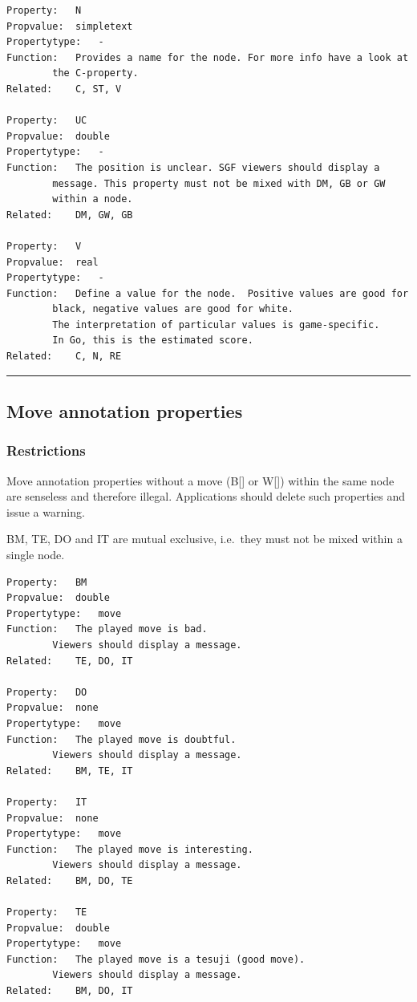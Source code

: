 \begin{verbatim}
Property:   N
Propvalue:  simpletext
Propertytype:   -
Function:   Provides a name for the node. For more info have a look at
        the C-property.
Related:    C, ST, V

Property:   UC
Propvalue:  double
Propertytype:   -
Function:   The position is unclear. SGF viewers should display a
        message. This property must not be mixed with DM, GB or GW
        within a node.
Related:    DM, GW, GB

Property:   V
Propvalue:  real
Propertytype:   -
Function:   Define a value for the node.  Positive values are good for
        black, negative values are good for white.
        The interpretation of particular values is game-specific.
        In Go, this is the estimated score.
Related:    C, N, RE
\end{verbatim}

\begin{center}\rule{0.5\linewidth}{0.5pt}\end{center}

\subsection{Move annotation
properties}\label{move-annotation-properties}

\subsubsection{Restrictions}\label{restrictions-1}

Move annotation properties without a move (B{[}{]} or W{[}{]}) within
the same node are senseless and therefore illegal. Applications should
delete such properties and issue a warning.

BM, TE, DO and IT are mutual exclusive, i.e.~they must not be mixed
within a single node.

\begin{verbatim}
Property:   BM
Propvalue:  double
Propertytype:   move
Function:   The played move is bad.
        Viewers should display a message.
Related:    TE, DO, IT

Property:   DO
Propvalue:  none
Propertytype:   move
Function:   The played move is doubtful.
        Viewers should display a message.
Related:    BM, TE, IT

Property:   IT
Propvalue:  none
Propertytype:   move
Function:   The played move is interesting.
        Viewers should display a message.
Related:    BM, DO, TE

Property:   TE
Propvalue:  double
Propertytype:   move
Function:   The played move is a tesuji (good move).
        Viewers should display a message.
Related:    BM, DO, IT
\end{verbatim}

